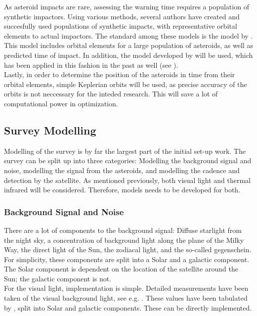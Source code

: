 \documentclass[12pt, english, NoHyper]{AE4010-template}
\begin{document}
As asteroid impacts are rare, assessing the warning time requires a population of synthetic impactors. Using various methods, several authors have created and succesfully used populations of synthetic impacts, with representative orbital elements to actual impactors. The standard among these models is the model by \cite{ChelseyPop}. This model includes orbital elements for a large population of asteroids, as well as predicted time of impact. In addition, the model developed by \cite{Flyeye} will be used, which has been applied in this fashion in the past as well (see \cite{ThesisOlga}).\\

Lastly, in order to determine the position of the asteroids in time from their orbital elements, simple Keplerian orbits will be used, as precise accuracy of the orbits is not neccessary for the inteded research. This will save a lot of computational power in optimization.


\subsection{Survey Modelling}
Modelling of the survey is by far the largest part of the initial set-up work. The survey can be split up into three categories: Modelling the background signal and noise, modelling the signal from the asteroids, and modelling the cadence and detection by the satellite. As mentioned previously, both visual light and thermal infrared will be considered. Therefore, models needs to be developed for both.

\subsubsection{Background Signal and Noise}
There are a lot of components to the background signal: Diffuse starlight from the night sky, a concentration of background light along the plane of the Milky Way, the direct light of the Sun, the zodiacal light, and the so-called gegenschein. For simplicity, these components are split into a Solar and a galactic component. The Solar component is dependent on the location of the satellite around the Sun; the galactic component is not. \\

For the visual light, implementation is simple. Detailed measurements have been taken of the visual background light, see e.g. \cite{LightOfTheNightSky}. These values have been tabulated by \cite{DiffuseSkyBrightness}, split into Solar and galactic components. These can be directly implemented. \\
\end{document}
